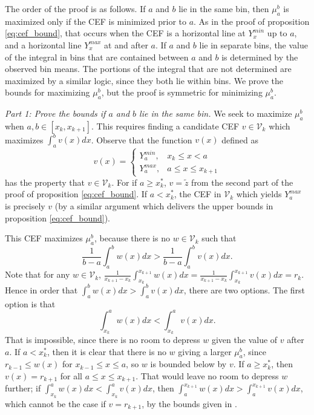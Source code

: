 The order of the proof is as follows. If $a$ and $b$ lie in the same
bin, then $\mu_a^b$ is maximized only if the CEF is minimized prior to
$a$. As in the proof of proposition \ref{eq:cef_bound}, that occurs when
the CEF is a horizontal line at $Y_x^{min}$ up to $a$, and a
horizontal line $Y_x^{max}$ at and after $a$. If $a$ and $b$ lie in separate bins, the
value of the integral in bins that are contained between $a$ and $b$ is determined by
the observed bin means. The portions of the integral that are not
determined are maximized by a similar logic, since they both lie
within bins. We prove the bounds for
maximizing $\mu_a^b$, but the proof is symmetric
for minimizing $\mu_a^b$. 

\textit{Part 1: Prove the bounds if $a$ and $b$ lie in the same bin.} We
seek to maximize $\mu_a^b$ when $a, b \in [x_k,x_{k+1}]$. This
requires finding a candidate CEF $v \in \mathcal{V}_k$ which maximizes $\int_a^b
v(x) dx$. Observe that the function
$v(x)$ defined as $$ v(x) = \begin{cases}
Y_a^{min}, &x_k \leq x < a \\ 
Y_a^{max}, &a \leq x \leq x_{k+1} 
\end{cases}
$$ 
has the property that $v \in \mathcal{V}_k$. For if $a \geq x_k^*$, $v = \tilde{z}$
from the second part of the proof of
proposition \ref{eq:cef_bound}. If $a < x_k^*$, the CEF in $\mathcal{V}_k$ which
yields $Y_a^{max}$ is precisely $v$ (by a similar argument which delivers the upper bounds in
proposition \ref{eq:cef_bound}). 

This CEF maximizes $\mu_a^b$, because
there is no $w \in \mathcal{V}_k$ such that $$\frac{1}{b-a} \int_{a}^{b}
w(x) dx > \frac{1}{b-a}
\int_{a}^{b} v(x)dx.$$ Note that for any $w \in \mathcal{V}_k$, $\frac{1}{x_{k+1} - x_k} \int_{x_k}^{x_{k+1}} w(x)dx =
\frac{1}{x_{k+1} - x_k} \int_{x_k}^{x_{k+1}} v(x)dx = r_k$. Hence in
order that $\int_{a}^{b} w(x)dx > \int_{a}^{b} v(x)dx$, there are two
options. The first option is that $$ \int_{x_k}^{a}
w(x)dx < \int_{x_k}^{a} v(x)dx.$$ That is impossible, since there is
no room to depress $w$ given the value of $v$ after $a$. If $a < x_k^*$, then it is
clear that there is no $w$ giving a larger $\mu_a^b$, since
$r_{k-1} \leq w(x)$ for $x_{k-1} \leq x \leq a$, so $w$ is bounded below by $v$. If $a \geq x_k^*$, then $v(x) = r_{k+1}$ for all $a \leq x \leq
x_{k+1}$. That would leave no room to depress $w$ further; if $ \int_{x_k}^{a}
w(x)dx < \int_{x_k}^{a} v(x)dx$, then $\int_{a}^{x_{k+1}} w(x) dx
> \int_{a}^{x_{k+1}} v(x) dx $, which cannot be the case if $v =
r_{k+1}$, by the bounds given in \citet{Manski2002}. 

